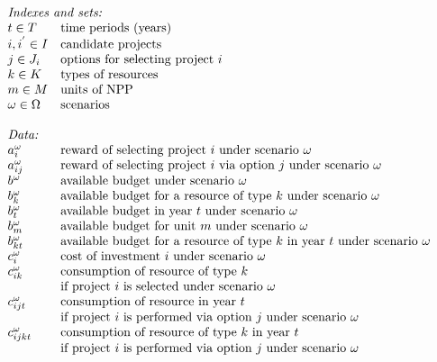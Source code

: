 \[
\begin{array}{ll}
\multicolumn{2}{l}{\mbox{\em Indexes and sets:} } \\
t \in T  & \mbox{time periods (years)} \\
i,i^{'} \in I  & \mbox{candidate projects} \\
j \in J_{i}	& \mbox{options for selecting project $i$} \\
k \in K	& \mbox{types of resources} \\
m \in M & \mbox{units of NPP} \\
\omega \in \Omega & \mbox{scenarios}\\
\\
\multicolumn{2}{l}{\mbox{\em Data:}} \\
a_{i}^{\omega} & \mbox{reward of selecting project $i$ under scenario $\omega$}  \\
a_{ij}^{\omega} & \mbox{reward of selecting project $i$ via option $j$ under scenario $\omega$}  \\
b^{\omega} & \mbox{available budget under scenario $\omega$}\\
b_{k}^{\omega} & \mbox{available budget for a resource of type $k$ under scenario $\omega$}\\
b_{t}^{\omega} & \mbox{available budget in year $t$ under scenario $\omega$}\\
b_{m}^{\omega} & \mbox{available budget for unit $m$ under scenario $\omega$}\\
b_{kt}^{\omega} & \mbox{available budget for a resource of type $k$ in year $t$ under scenario $\omega$}\\
c_{i}^{\omega} & \mbox{cost of investment $i$ under scenario $\omega$} \\
c_{ik}^{\omega} & \mbox{consumption of resource of type $k$} \\
& \mbox{if project $i$ is selected under scenario $\omega$}\\
c_{ijt}^{\omega} & \mbox{consumption of resource in year $t$ } \\
& \mbox{if project $i$ is performed via option $j$ under scenario $\omega$}\\
c_{ijkt}^{\omega} & \mbox{consumption of resource of type $k$ in year $t$ } \\
& \mbox{if project $i$ is performed via option $j$ under scenario $\omega$}\\

\end{array}\]
